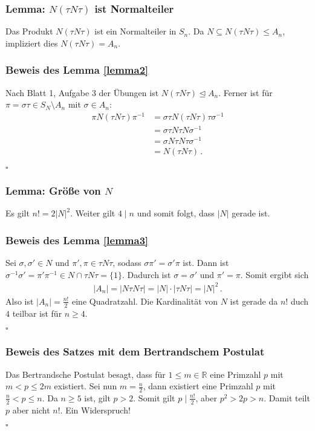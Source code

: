 \documentclass[12pt, german]{article}
\newcommand{\bewiesen}{
	
	\begin{flushright}
		$\square$  \\
\end{flushright}}
\begin{document}
	\subsubsection{Lemma: $N(\tau N\tau)$ ist Normalteiler \label{lemma2}}
	Das Produkt $N(\tau N \tau)$ ist ein Normalteiler in $S_n$. Da $N \subseteq N(\tau N \tau) \leq A_n$, impliziert dies $N(\tau N \tau) = A_n$.
	\subsubsection{Beweis des Lemma \ref{lemma2}}
	Nach Blatt 1, Aufgabe 3 der Übungen ist $N(\tau N \tau) \trianglelefteq A_n$. Ferner ist für $\pi = \sigma\tau \in S_N \setminus A_n$ mit $\sigma \in A_n$: 
	\begin{align*}
		\pi N(\tau N\tau) \pi^{-1} &= \sigma \tau N (\tau N \tau) \tau \sigma^{-1}  \\ 
		&= \sigma\tau N \tau N  \sigma^{-1} \\
		&= \sigma N \tau N \tau \sigma^{-1} \\
		&= N(\tau N \tau)\, .
	\end{align*}
	\bewiesen
	
	\subsubsection{Lemma: Grö\ss e von $N$ \label{lemma3}}
	Es gilt $n! = 2 |N|^2$. Weiter gilt $4 \mid n$ und somit folgt, dass $|N|$ gerade ist. 
	\subsubsection{Beweis des Lemma \ref{lemma3}}
	Sei $\sigma, \sigma' \in N$ und $\pi', \pi \in \tau N \tau$, sodass $\sigma\pi' = \sigma'\pi$ ist. Dann ist $\sigma^{-1}\sigma' = \pi'\pi^{-1} \in N \cap \tau N \tau = \{1\}$. Dadurch ist $\sigma = \sigma'$ und $\pi' = \pi$. Somit ergibt sich 
	\begin{align*}
		|A_n| = |N\tau N\tau| = |N| \cdot |\tau N \tau| = |N|^2\, .
	\end{align*}
	Also ist $|A_n| =\frac{n!}{2}$ eine Quadratzahl. Die Kardinalität von $N$ ist gerade da $n!$ duch $4$ teilbar ist für $n \geq 4$. 
	\bewiesen
	
	\subsubsection{Beweis des Satzes mit dem Bertrandschem Postulat}
	Das Bertrandsche Postulat besagt, dass für $1 \leq m \in \mathbb R$ eine Primzahl $p$ mit $m < p \leq 2m$ existiert. 
	\newline
	Sei nun $m =\frac{n}{2}$, dann existiert eine Primzahl $p$ mit $\frac{n}{2} < p \leq n$. Da $n \geq 5$ ist, gilt $p > 2$. Somit gilt $p \mid \frac{n!}{2}$, aber $p^2 > 2p >  n$. Damit teilt $p$ aber nicht $n!$. Ein Widerspruch!
	\bewiesen
	
\end{document}
